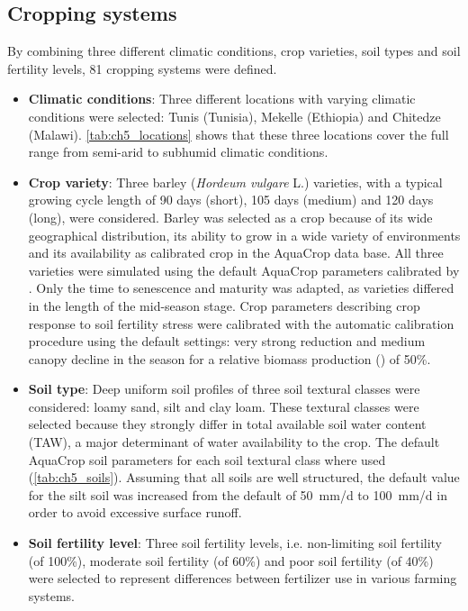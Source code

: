 \subsection{Cropping systems}
By combining three different climatic conditions, crop varieties, soil types and soil fertility levels, 81 cropping systems were defined.
\begin{itemize}
\item \textbf{Climatic conditions}: Three different locations with varying climatic conditions were selected: Tunis (Tunisia), Mekelle (Ethiopia) and Chitedze (Malawi). \autoref{tab:ch5_locations} shows that these three locations cover the full range from semi-arid to subhumid climatic conditions. 
\item \textbf{Crop variety}: Three barley (\textit{Hordeum vulgare} L.) varieties, with a typical growing cycle length of 90 days (short), 105 days (medium) and 120 days (long)\parencite{fao2007}, were considered. Barley was selected as a crop because of its wide geographical distribution, its ability to grow in a wide variety of environments and its availability as calibrated crop in the AquaCrop data base. All three varieties were simulated using the default AquaCrop parameters calibrated by \textcite{abrha2012}. Only the time to senescence and maturity was adapted, as varieties differed in the length of the mid-season stage. Crop parameters describing crop response to soil fertility stress were calibrated with the automatic calibration procedure using the default settings: very strong \CCx reduction and medium canopy decline in the season for a relative biomass production (\Brel) of 50\%.
\item \textbf{Soil type}: Deep uniform soil profiles of three soil textural classes were considered: loamy sand, silt and clay loam. These textural classes were selected because they strongly differ in total available soil water content (TAW), a major determinant of water availability to the crop. The default AquaCrop soil parameters for each soil textural class where used (\autoref{tab:ch5_soils}). Assuming that all soils are well structured, the default \Ksat value for the silt soil was increased from the default of \SI{50}{mm/d} to \SI{100}{mm/d} in order to avoid excessive surface runoff.
\item \textbf{Soil fertility level}: Three soil fertility levels, i.e. non-limiting soil fertility (\Brel of 100\%), moderate soil fertility (\Brel of 60\%) and poor soil fertility (\Brel of 40\%) were selected to represent differences between fertilizer use in various farming systems.
\end{itemize}

